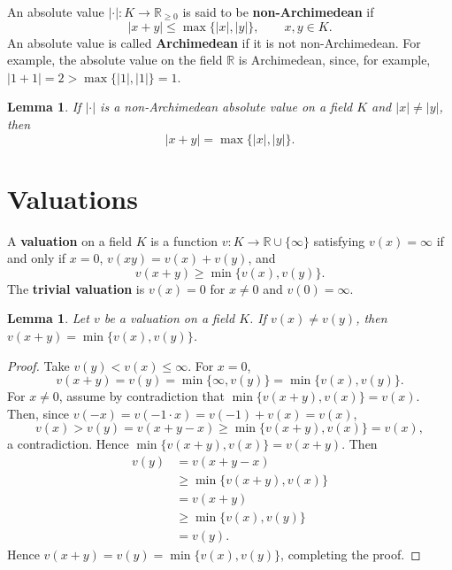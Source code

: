 \documentclass{article}
\theoremstyle{plain}
\newtheorem{lemma}[theorem]{Lemma}
\theoremstyle{definition}
\begin{document}
An absolute value $|\cdot|:K \to  \mathbb{R}_{\geq 0}$ is said to be \textbf{non-Archimedean} if
\[
|x+y| \leq \max\{|x|,|y|\}, \qquad x,y \in K.
\]
An absolute value is called \textbf{Archimedean} if it is not non-Archimedean. For example, the absolute value on the field
$\mathbb{R}$ is Archimedean, since, for example, $|1+1|=2>\max\{|1|,|1|\}=1$. 

\begin{lemma}
If $|\cdot|$ is a non-Archimedean absolute value on a field $K$ and $|x| \neq |y|$, then
\[
|x+y| = \max\{|x|,|y|\}.
\]
\end{lemma}





\section{Valuations}
A \textbf{valuation} on a field $K$ is a function $v:K \to \mathbb{R} \cup \{\infty\}$
satisfying $v(x)=\infty$ if and only if $x=0$, $v(xy)=v(x)+v(y)$, and
\[
v(x+y) \geq \min\{v(x),v(y)\}.
\]
The \textbf{trivial valuation} is $v(x)=0$ for $x \neq 0$ and $v(0)=\infty$. 

\begin{lemma}
Let $v$ be a valuation on a field $K$. If $v(x) \neq v(y)$, then $v(x+y)=\min\{v(x),v(y)\}$.
\end{lemma}
\begin{proof}
Take $v(y)<v(x) \leq \infty$. For $x=0$,
\[
v(x+y)=v(y)=\min\{\infty,v(y)\} = \min\{v(x),v(y)\}.
\]
For $x \neq 0$, assume by contradiction that $\min\{v(x+y),v(x)\}=v(x)$. Then, since $v(-x)=v(-1\cdot x)=v(-1)+ v(x)=v(x)$,
\[
v(x)>v(y)
=v(x+y-x)
\geq \min\{v(x+y),v(x)\}
=v(x),
\]
a contradiction. Hence $\min\{v(x+y),v(x)\}=v(x+y)$. Then
\begin{align*}
v(y)&=v(x+y-x)\\
&\geq \min\{v(x+y),v(x)\}\\
&=v(x+y)\\
&\geq \min\{v(x),v(y)\}\\
&=v(y).
\end{align*}
Hence $v(x+y)=v(y)=  \min\{v(x),v(y)\}$, completing the proof.
\end{proof}
\end{document}
